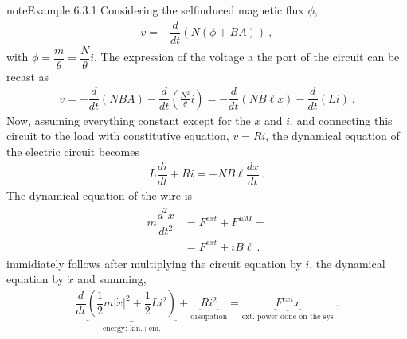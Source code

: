\documentclass[letterpaper,10pt,english]{jupyterBook}
\begin{document}
\begin{sphinxadmonition}{note}{Example 6.3.1}
\sphinxAtStartPar
{} Considering the self\sphinxhyphen{}induced magnetic flux \(\phi\),
\begin{equation*}
\begin{split}v = - \dfrac{d}{dt} \left( N \left( \phi + B A \right) \right) \ ,\end{split}
\end{equation*}
\sphinxAtStartPar
with \(\phi = \dfrac{m}{\theta} = \dfrac{N}{\theta} i\). The expression of the voltage a the port of the circuit can be recast as
\begin{equation*}
\begin{split}v = - \dfrac{d}{dt} \left( N B A \right) - \dfrac{d}{dt} \left( \frac{N^2}{\theta} i \right) = - \dfrac{d}{dt} \left( N B \ell x \right) - \dfrac{d}{dt} \left( L i \right) \ .\end{split}
\end{equation*}
\sphinxAtStartPar
Now, assuming everything constant except for the \(x\) and \(i\), and connecting this circuit to the load with constitutive equation, \(v = R i\), the dynamical equation of the electric circuit becomes
\begin{equation*}
\begin{split}L \dfrac{d i}{d t} + R i = - N B \ell \dfrac{d x}{d t} \ .\end{split}
\end{equation*}
\sphinxAtStartPar
The dynamical equation of the wire is
\begin{equation*}
\begin{split}\begin{aligned}
 m \dfrac{d^2 x}{d t^2} 
 & = F^{ext} + F^{EM} = \\
 & = F^{ext} + i B \ell \ .
\end{aligned}\end{split}
\end{equation*}
\sphinxAtStartPar
{} immidiately follows after multiplying the circuit equation by \(i\), the dynamical equation by \(\dot{x}\) and summing,
\begin{equation*}
\begin{split}\dfrac{d}{dt} \underbrace{\left( \dfrac{1}{2} m |\dot{x}|^2 + \dfrac{1}{2} L i^2 \right)}_{\text{energy: kin.+em.}} + \underbrace{R i^2}_{\text{dissipation}} = \underbrace{F^{ext} \dot{x}}_{\text{ext. power done on the sys}} \ .\end{split}
\end{equation*}\end{sphinxadmonition}
\end{document}
